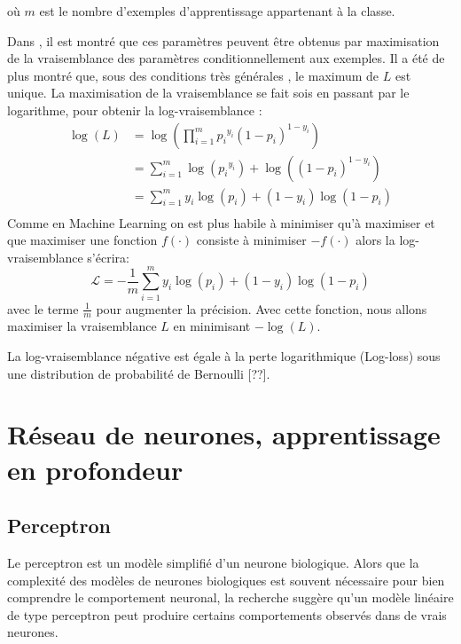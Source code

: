 	où $m$ est le nombre d'exemples d'apprentissage appartenant à la classe.
	
	Dans \cite{antoine2018apprentissage}, il est montré que ces paramètres peuvent être obtenus par maximisation de la vraisemblance des paramètres conditionnellement aux exemples. Il a été de plus montré que, sous des conditions très générales \cite{sarkar2017practical}, le maximum de $L$ est unique.
	La maximisation de la vraisemblance se fait sois en passant par le logarithme, pour obtenir la log-vraisemblance :
	\begin{equation}
	\begin{split}
	\log(L)  & = \log(\prod_{i=1}^{m} {p_i}^{y_i} (1-p_i)^{1-y_i}) \\
	& =\sum_{i=1}^{m} \log( {p_i}^{y_i}) +\log((1-p_i)^{1-y_i})\\
	& =\sum_{i=1}^{m} {y_i}\log( {p_i}) +{(1-y_i)}\log(1-p_i)\\
	\end{split}
	\end{equation}
	Comme en Machine Learning on est plus habile à minimiser qu'à maximiser et que maximiser une fonction $f(\cdot)$ consiste à minimiser $-f(\cdot)$ alors la log-vraisemblance s'écrira: 
	\begin{equation}\label{eq:log-likelyhood}
		\mathcal{L} = -\frac{1}{m}\sum_{i=1}^{m} {y_i}\log( {p_i}) +{(1-y_i)}\log(1-p_i)
	\end{equation}
	avec le terme $\frac{1}{m}$ pour augmenter la précision. Avec cette fonction, nous allons maximiser la vraisemblance $L$ en minimisant $-\log(L)$.
	
	La log-vraisemblance négative est égale à la perte logarithmique (Log-loss) sous une distribution de probabilité de Bernoulli [??].	
	
	
	\section{Réseau de neurones, apprentissage en profondeur}
	
	\subsection{Perceptron} \label{sec:perceptron}
	
	Le perceptron est un modèle simplifié d'un neurone biologique. Alors que la complexité des modèles de neurones biologiques est souvent nécessaire pour bien comprendre le comportement neuronal, la recherche suggère qu'un modèle linéaire de type perceptron peut produire certains comportements observés dans de vrais neurones.
	
